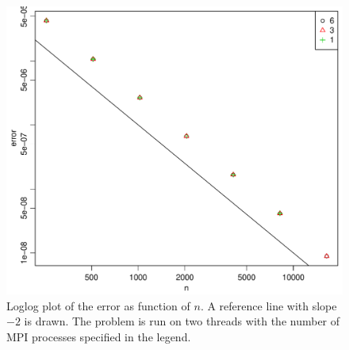 \begin{figure}[h!]
\begin{center}
    \includegraphics[scale=0.4]{./Figures/errVsn.pdf}
\end{center}
  \vspace{-1\baselineskip}
\caption{Loglog plot of the error as function of $n$. A reference line with slope $-2$ is drawn. The problem is run on two threads with the number of MPI processes specified in the legend.}
\label{fig:errVsn}
\end{figure}
%
\\
%
